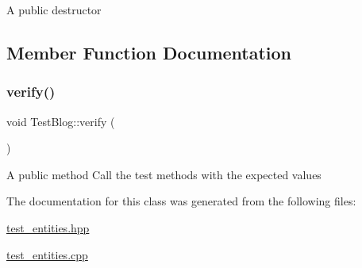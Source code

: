 A public destructor 

\subsection{Member Function Documentation}
\mbox{\label{class_test_blog_a927d67cdfb5807554fef14270cb927dd}} 
\subsubsection{\texorpdfstring{verify()}{verify()}}
{\footnotesize\ttfamily void Test\+Blog\+::verify (\begin{DoxyParamCaption}{ }\end{DoxyParamCaption})}

A public method Call the test methods with the expected values 

The documentation for this class was generated from the following files\+:\begin{DoxyCompactItemize}
\item 
\hyperlink{test__entities_8hpp}{test\+\_\+entities.\+hpp}\item 
\hyperlink{test__entities_8cpp}{test\+\_\+entities.\+cpp}\end{DoxyCompactItemize}
